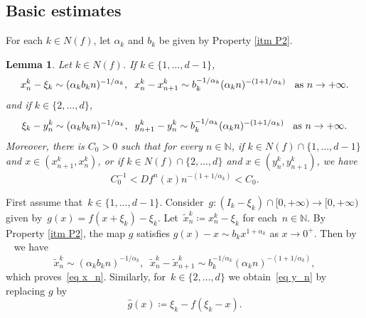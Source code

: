 \documentclass[12pt]{amsart}
\numberwithin{equation}{section} %
\numberwithin{figure}{section} %
\theoremstyle{plain}
\newtheorem{lemm}[prop]{Lemma}
\theoremstyle{definition}
\theoremstyle{remark}
\theoremstyle{citing}
\newcommand{\N}{\mathbb{N}}
\renewcommand{\=}{\coloneqq}
\begin{document}
\subsection{Basic estimates}\label{subseq: Basic estimates}
For each $k\in N(f)$, let $\alpha_k$ and $b_k$ be given by Property \ref{itm P2}.
\begin{lemm}\label{Lemma M-P estimates}
    Let $k\in N(f)$. If $k\in\{1,\ldots,d-1\}$,
    \begin{equation}\label{eq x_n}
     x_n^k - \xi_k \sim (\alpha_kb_kn)^{-1/\alpha_k}, \;\; x_n^k - x_{n+1}^k \sim b_k^{-1/\alpha_k} (\alpha_k n )^{-(1+1/\alpha_k)} \text{\;\; as }n\to+\infty.
    \end{equation}
    and if $k\in \{2,\ldots,d\}$,
    \begin{equation}\label{eq y_n}
       \xi_k - y_{n}^k \sim (\alpha_kb_kn)^{-1/\alpha_k}, \;\;y_{n+1}^k - y_{n}^k \sim b_k^{-1/\alpha_k} (\alpha_k n )^{-(1+1/\alpha_k)} \text{\;\; as }n\to+\infty.
    \end{equation}
    Moreover, there is $C_0>0$ such that for every $n\in \mathbb{N}$, if $k\in N(f)\cap\{1,\ldots,d-1\}$ and $x\in(x^k_{n+1},x^k_n)$, or if $k\in N(f)\cap\{2,\ldots,d\}$ and $x\in(y^k_n,y^k_{n+1})$, we have
    \begin{equation}\label{eq Df^n}
        C_0^{-1}<Df^n(x)n^{-(1+1/\alpha_k)}<C_0.
    \end{equation}
\end{lemm}
\proof
    First assume that~$k\in\{1,\ldots,d-1\}$. Consider~$g:(I_k-\xi_k)\cap[0,+\infty)\to [0,+\infty)$ given 
    by~$g(x)= f(x+\xi_k) -\xi_k$. Let~$\widetilde{x}_n^k\= x_n^k - \xi_k$ for each~$n\in\N$. By Property \ref{itm P2}, the map $g$ satisfies $g(x)-x\sim b_k x^{1+\alpha_k}$ as $x\to 0^+$. Then by ~\cite[Sublemma 4.4]{CoatesMelbourneTalebi} we have
    \begin{equation*}
         \widetilde{x}_n^k \sim (\alpha_kb_kn)^{-1/\alpha_k}, \;\; \widetilde{x}_n^k - \widetilde{x}_{n+1}^k \sim b_k^{-1/\alpha_k} (\alpha_k n )^{-(1+1/\alpha_k)},
    \end{equation*}
    which proves~\eqref{eq x_n}. Similarly, for~$k\in\{2,\ldots,d\}$ we obtain~\eqref{eq y_n} by replacing $g$ 
    by 
    \begin{equation*}
    \widehat{g}(x) \= \xi_k-f(\xi_k-x).
    \end{equation*}
\end{document}

